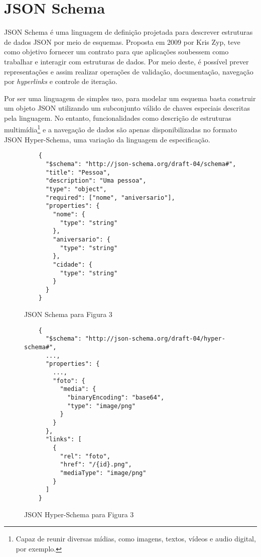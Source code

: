 \section[JSON Schema]{JSON Schema}

JSON Schema é uma linguagem de definição projetada para descrever estruturas de dados JSON por meio de esquemas. Proposta em 2009 por Kris Zyp, teve como objetivo fornecer um contrato para que aplicações soubessem como trabalhar e interagir com estruturas de dados. Por meio deste, é possível prever representações e assim realizar operações de validação, documentação, navegação por \textit{hyperlinks} e controle de iteração. \cite{Zyp2013}

Por ser uma linguagem de simples uso, para modelar um esquema basta construir um objeto JSON utilizando um subconjunto válido de chaves especiais descritas pela linguagem. No entanto, funcionalidades como descrição de estruturas multimídia\footnote{
 Capaz de reunir diversas mídias, como imagens, textos, vídeos e audio digital, por exemplo.
} e a navegação de dados são apenas disponibilizadas no formato JSON Hyper-Schema, uma variação da linguagem de especificação. \cite{Jackson2016}

\begin{figure}[H]
  \centering
  \begin{verbatim}
    {
      "$schema": "http://json-schema.org/draft-04/schema#",
      "title": "Pessoa",
      "description": "Uma pessoa",
      "type": "object",
      "required": ["nome", "aniversario"],
      "properties": {
        "nome": {
          "type": "string"
        },
        "aniversario": {
          "type": "string"
        },
        "cidade": {
          "type": "string"
        }
      }
    }
  \end{verbatim}
  \caption{JSON Schema para Figura 3}
\end{figure}

\begin{figure}[H]
  \centering
  \begin{verbatim}
    {
      "$schema": "http://json-schema.org/draft-04/hyper-schema#",
      ...,
      "properties": {
        ...,
        "foto": {
          "media": {
            "binaryEncoding": "base64",
            "type": "image/png"
          }
        }
      },
      "links": [
        {
          "rel": "foto",
          "href": "/{id}.png",
          "mediaType": "image/png"
        }
      ]
    }
  \end{verbatim}
  \caption{JSON Hyper-Schema para Figura 3}
\end{figure}

